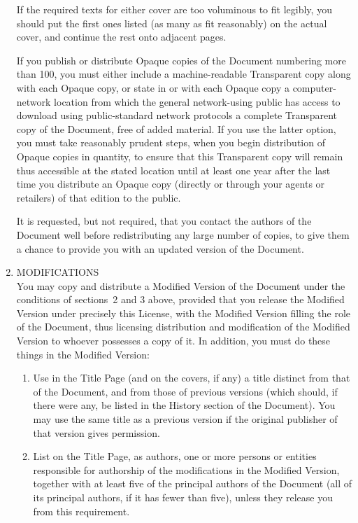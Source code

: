 \begin{enumerate}
  If the required texts for either cover are too voluminous to fit legibly, you should put the
  first ones listed (as many as fit reasonably) on the actual cover, and continue the rest onto
  adjacent pages.

  If you publish or distribute Opaque copies of the Document numbering more than 100, you must
  either include a machine-readable Transparent copy along with each Opaque copy, or state in or
  with each Opaque copy a computer-network location from which the general network-using public
  has access to download using public-standard network protocols a complete Transparent copy of
  the Document, free of added material.  If you use the latter option, you must take reasonably
  prudent steps, when you begin distribution of Opaque copies in quantity, to ensure that this
  Transparent copy will remain thus accessible at the stated location until at least one year
  after the last time you distribute an Opaque copy (directly or through your agents or
  retailers) of that edition to the public.

  It is requested, but not required, that you contact the authors of the Document well before
  redistributing any large number of copies, to give them a chance to provide you with an
  updated version of the Document.

\item
  MODIFICATIONS \\
  You may copy and distribute a Modified Version of the Document under the conditions of
  sections~2 and 3 above, provided that you release the Modified Version under precisely this
  License, with the Modified Version filling the role of the Document, thus licensing
  distribution and modification of the Modified Version to whoever possesses a copy of it.  In
  addition, you must do these things in the Modified Version:

  \begin{enumerate}
    \renewcommand{\labelenumii}{\Alph{enumii}.}
  \item
    Use in the Title Page (and on the covers, if any) a title distinct from that of the
    Document, and from those of previous versions (which should, if there were any, be listed in
    the History section of the Document).  You may use the same title as a previous version if
    the original publisher of that version gives permission.

  \item
    List on the Title Page, as authors, one or more persons or entities responsible for
    authorship of the modifications in the Modified Version, together with at least five of the
    principal authors of the Document (all of its principal authors, if it has fewer than five),
    unless they release you from this requirement.


\end{enumerate}
\end{enumerate}
